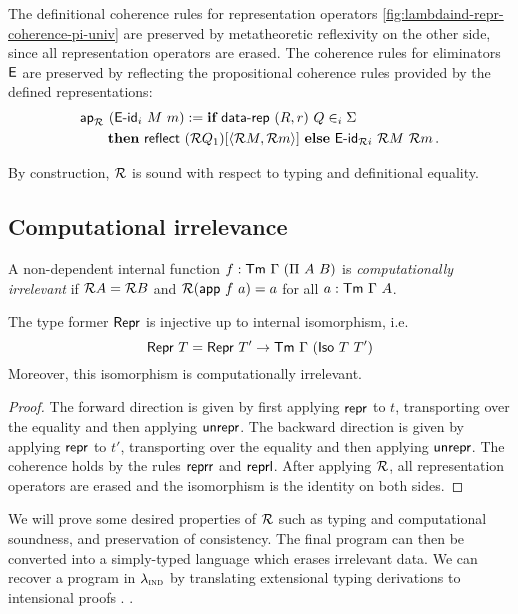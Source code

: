 The definitional coherence rules for representation operators
\cref{fig:lambdaind-repr-coherence-pi-univ} are preserved by metatheoretic
reflexivity on the other side, since all representation operators are erased.
The coherence rules for eliminators $\textsf{E}$ are preserved by reflecting the
propositional coherence rules provided by the defined representations:
\begin{align*}
& \mta{ap}_\R\ (\mta{E-id}_i\ M\ m) :=  \kwd{if}\ \mta{data-rep}\ (R, r)\ Q \in_i \Sigma\ \\
      &\qquad \kwd{then}\ \mta{reflect}\ (\R Q_1)[\Msub{\R M, \R m}]\ \kwd{else}\ \mta{E-id}_{\R i}\ \R M\ \R m \,.
\end{align*}

By construction, $\mathcal{R}$ is sound with respect to typing and definitional equality.

\subsection{Computational irrelevance}

\begin{definition}
    A non-dependent internal function $f : \textsf{Tm}\ \Gamma\ (\Pi\ A\ B)$ is \emph{computationally irrelevant} if
    $\mathcal{R} A = \mathcal{R} B$ and $\mathcal{R} (\textsf{app}\ f\ a) = a$ for all $a : \textsf{Tm}\ \Gamma\ A$.
\end{definition}

\begin{lemma}
	The type former $\textsf{Repr}{}$ is injective up to internal isomorphism, i.e.
	\begin{equation}
	\mta{Repr}\ T = \mta{Repr}\ T' \to \Tm\ \Gamma\ (\mta{Iso}\ T\ T')
	\end{equation}
	Moreover, this isomorphism is computationally irrelevant.
	\begin{proof}
	The forward direction is given by first applying $\textsf{repr}$ to $t$,
	transporting over the equality and then applying $\textsf{unrepr}$. The
	backward direction is given by applying $\textsf{repr}$ to $t'$, transporting
	over the equality and then applying $\textsf{unrepr}$. The coherence holds by
	the rules $\textsf{reprr}$ and $\textsf{reprl}$. After applying $\mathcal{R}$, all
	representation operators are erased and the isomorphism is the identity on both
	sides.
	\end{proof}
\end{lemma}


We will prove some desired properties
of $\mathcal{R}$ \cite{Boulier2017-cm} such as typing and computational soundness, and
preservation of consistency. The final program can then be converted into a
simply-typed language which erases irrelevant data. We can recover a program in
$\lambda_{\textsc{ind}}$ by translating extensional typing derivations to intensional proofs
\cite{Winterhalter2019-zw}.
\cite{Winterhalter2019-zw}.
